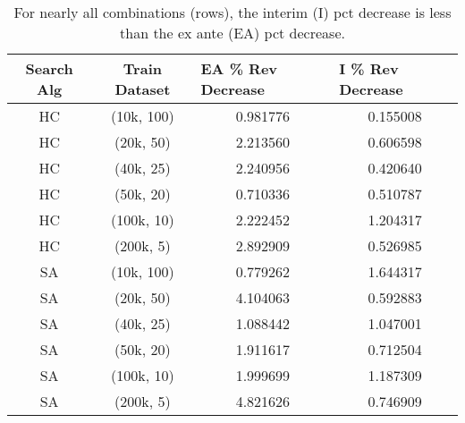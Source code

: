 \begin{table}[ht]
\begin{tabular}{c|c|c|c}
Search Alg & Train Dataset & \multicolumn{1}{l}{EA \% Rev Decrease} & \multicolumn{1}{|l}{I \% Rev Decrease} \\
\hline
HC         & (10k, 100)    & 0.981776                              & 0.155008                             \\
HC         & (20k, 50)     & 2.213560                              & 0.606598                             \\
HC         & (40k, 25)     & 2.240956                              & 0.420640                             \\
HC         & (50k, 20)     & 0.710336                              & 0.510787                             \\
HC         & (100k, 10)    & 2.222452                              & 1.204317                             \\
HC         & (200k, 5)     & 2.892909                              & 0.526985                             \\
SA         & (10k, 100)    & 0.779262                              & 1.644317                             \\
SA         & (20k, 50)     & 4.104063                              & 0.592883                             \\
SA         & (40k, 25)     & 1.088442                              & 1.047001                             \\
SA         & (50k, 20)     & 1.911617                              & 0.712504                             \\
SA         & (100k, 10)    & 1.999699                              & 1.187309                             \\
SA         & (200k, 5)     & 4.821626                              & 0.746909                            
\end{tabular}
\caption{ 
For nearly all combinations (rows), the interim (I) pct decrease is less than the ex ante (EA) pct decrease.  }
\label{table:game1_pct_decr_results}
\end{table}